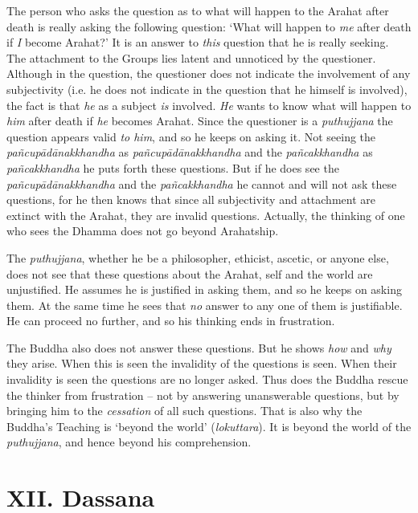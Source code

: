 The person who asks the question as to what will happen to the Arahat after death is really asking the following question: `What will happen to \emph{me} after death if \emph{I} become Arahat?' It is an answer to \emph{this} question that he is really seeking. The attachment to the Groups lies latent and unnoticed by the questioner. Although in the question, the questioner does not indicate the involvement of any subjectivity (i.e. he does not indicate in the question that he himself is involved), the fact is that \emph{he} as a subject \emph{is} involved. \emph{He} wants to know what will happen to \emph{him} after death if \emph{he} becomes Arahat. Since the questioner is a \textit{puthujjana} the question appears valid \emph{to him}, and so he keeps on asking it. Not seeing the \textit{pañcupādānakkhandha} as \textit{pañcupādānakkhandha} and the \textit{pañcakkhandha} as \textit{pañcakkhandha} he puts forth these questions. But if he does see the \textit{pañcupādānakkhandha} and the \textit{pañcakkhandha} he cannot and will not ask these questions, for he then knows that since all subjectivity and attachment are extinct with the Arahat, they are invalid questions. Actually, the thinking of one who sees the Dhamma does not go beyond Arahatship.

The \textit{puthujjana}, whether he be a philosopher, ethicist, ascetic, or anyone else, does not see that these questions about the Arahat, self and the world are unjustified. He assumes he is justified in asking them, and so he keeps on asking them. At the same time he sees that \emph{no} answer to any one of them is justifiable. He can proceed no further, and so his thinking ends in frustration.

The Buddha also does not answer these questions. But he shows \emph{how} and \emph{why} they arise. When this is seen the invalidity of the questions is seen. When their invalidity is seen the questions are no longer asked. Thus does the Buddha rescue the thinker from frustration -- not by answering unanswerable questions, but by bringing him to the \emph{cessation} of all such questions. That is also why the Buddha's Teaching is `beyond the world' (\textit{lokuttara}). It is beyond the world of the \textit{puthujjana}, and hence beyond his comprehension.

\hypertarget{_xii_dassana}{%
\section{XII. Dassana}\label{_xii_dassana}}

